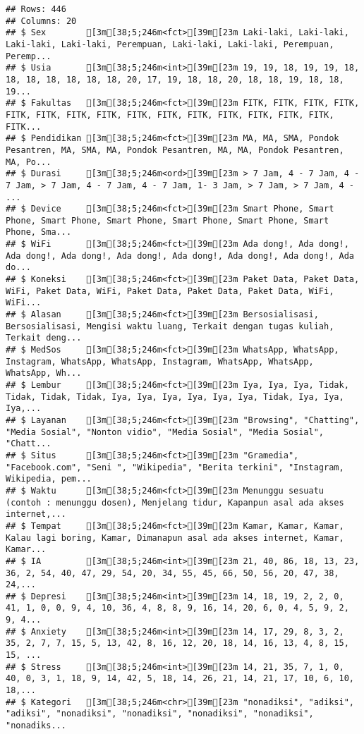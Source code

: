 \documentclass[
]{article}
\begin{document}
\begin{verbatim}
## Rows: 446
## Columns: 20
## $ Sex        [3m[38;5;246m<fct>[39m[23m Laki-laki, Laki-laki, Laki-laki, Laki-laki, Perempuan, Laki-laki, Laki-laki, Perempuan, Peremp...
## $ Usia       [3m[38;5;246m<int>[39m[23m 19, 19, 18, 19, 19, 18, 18, 18, 18, 18, 18, 18, 20, 17, 19, 18, 18, 20, 18, 18, 19, 18, 18, 19...
## $ Fakultas   [3m[38;5;246m<fct>[39m[23m FITK, FITK, FITK, FITK, FITK, FITK, FITK, FITK, FITK, FITK, FITK, FITK, FITK, FITK, FITK, FITK...
## $ Pendidikan [3m[38;5;246m<fct>[39m[23m MA, MA, SMA, Pondok Pesantren, MA, SMA, MA, Pondok Pesantren, MA, MA, Pondok Pesantren, MA, Po...
## $ Durasi     [3m[38;5;246m<ord>[39m[23m > 7 Jam, 4 - 7 Jam, 4 - 7 Jam, > 7 Jam, 4 - 7 Jam, 4 - 7 Jam, 1- 3 Jam, > 7 Jam, > 7 Jam, 4 - ...
## $ Device     [3m[38;5;246m<fct>[39m[23m Smart Phone, Smart Phone, Smart Phone, Smart Phone, Smart Phone, Smart Phone, Smart Phone, Sma...
## $ WiFi       [3m[38;5;246m<fct>[39m[23m Ada dong!, Ada dong!, Ada dong!, Ada dong!, Ada dong!, Ada dong!, Ada dong!, Ada dong!, Ada do...
## $ Koneksi    [3m[38;5;246m<fct>[39m[23m Paket Data, Paket Data, WiFi, Paket Data, WiFi, Paket Data, Paket Data, Paket Data, WiFi, WiFi...
## $ Alasan     [3m[38;5;246m<fct>[39m[23m Bersosialisasi, Bersosialisasi, Mengisi waktu luang, Terkait dengan tugas kuliah, Terkait deng...
## $ MedSos     [3m[38;5;246m<fct>[39m[23m WhatsApp, WhatsApp, Instagram, WhatsApp, WhatsApp, Instagram, WhatsApp, WhatsApp, WhatsApp, Wh...
## $ Lembur     [3m[38;5;246m<fct>[39m[23m Iya, Iya, Iya, Tidak, Tidak, Tidak, Tidak, Iya, Iya, Iya, Iya, Iya, Iya, Tidak, Iya, Iya, Iya,...
## $ Layanan    [3m[38;5;246m<fct>[39m[23m "Browsing", "Chatting", "Media Sosial", "Nonton vidio", "Media Sosial", "Media Sosial", "Chatt...
## $ Situs      [3m[38;5;246m<fct>[39m[23m "Gramedia", "Facebook.com", "Seni ", "Wikipedia", "Berita terkini", "Instagram, Wikipedia, pem...
## $ Waktu      [3m[38;5;246m<fct>[39m[23m Menunggu sesuatu (contoh : menunggu dosen), Menjelang tidur, Kapanpun asal ada akses internet,...
## $ Tempat     [3m[38;5;246m<fct>[39m[23m Kamar, Kamar, Kamar, Kalau lagi boring, Kamar, Dimanapun asal ada akses internet, Kamar, Kamar...
## $ IA         [3m[38;5;246m<int>[39m[23m 21, 40, 86, 18, 13, 23, 36, 2, 54, 40, 47, 29, 54, 20, 34, 55, 45, 66, 50, 56, 20, 47, 38, 24,...
## $ Depresi    [3m[38;5;246m<int>[39m[23m 14, 18, 19, 2, 2, 0, 41, 1, 0, 0, 9, 4, 10, 36, 4, 8, 8, 9, 16, 14, 20, 6, 0, 4, 5, 9, 2, 9, 4...
## $ Anxiety    [3m[38;5;246m<int>[39m[23m 14, 17, 29, 8, 3, 2, 35, 2, 7, 7, 15, 5, 13, 42, 8, 16, 12, 20, 18, 14, 16, 13, 4, 8, 15, 15, ...
## $ Stress     [3m[38;5;246m<int>[39m[23m 14, 21, 35, 7, 1, 0, 40, 0, 3, 1, 18, 9, 14, 42, 5, 18, 14, 26, 21, 14, 21, 17, 10, 6, 10, 18,...
## $ Kategori   [3m[38;5;246m<chr>[39m[23m "nonadiksi", "adiksi", "adiksi", "nonadiksi", "nonadiksi", "nonadiksi", "nonadiksi", "nonadiks...
\end{verbatim}
\end{document}
